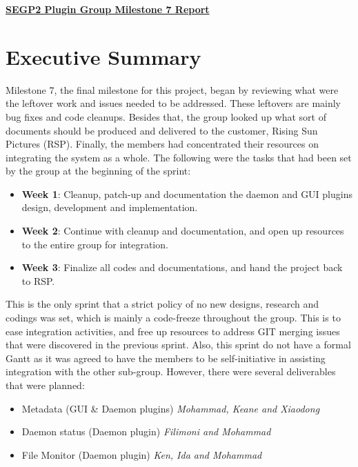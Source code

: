 \documentclass{article}
\begin{document}
\pagestyle{headings}

\begin{center}
{\textbf{\underline{SEGP2 Plugin Group Milestone 7 Report}}}
\end{center}


\section*{Executive Summary}

Milestone 7, the final milestone for this project, began by reviewing what were the leftover work and issues needed to be addressed. These leftovers are mainly bug fixes and code cleanups. Besides that, the group looked up what sort of documents should be produced and delivered to the customer, Rising Sun Pictures (RSP). Finally, the members had concentrated their resources on integrating the system as a whole. The following were the tasks that had been set by the group at the beginning of the sprint:

\begin{itemize}
    \item \textbf{Week 1}: Cleanup, patch-up and documentation the daemon and GUI plugins design, development and implementation.
    \item \textbf{Week 2}: Continue with cleanup and documentation, and open up resources to the entire group for integration.
    \item \textbf{Week 3}: Finalize all codes and documentations, and hand the project back to RSP. 
\end{itemize}

This is the only sprint that a strict policy of no new designs, research and codings was set, which is mainly a code-freeze throughout the group. This is to ease integration activities, and free up resources to address GIT merging issues that were discovered in the previous sprint. Also, this sprint do not have a formal Gantt as it was agreed to have the members to be self-initiative in assisting integration with the other sub-group. However, there were several deliverables that were planned:

\begin{itemize}
    \item Metadata (GUI \& Daemon plugins) \textit{Mohammad, Keane and Xiaodong}
    \item Daemon status (Daemon plugin) \textit{Filimoni and Mohammad}
    \item File Monitor (Daemon plugin) \textit{Ken, Ida and Mohammad}
\end{itemize}
\end{document}
